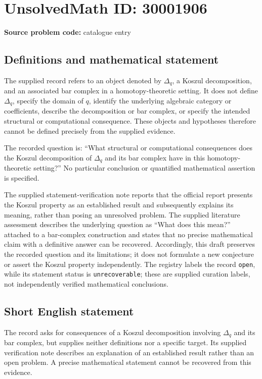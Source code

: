 \documentclass[11pt]{article}
\begin{document}
\section*{UnsolvedMath ID: 30001906}
\textbf{Source problem code:} catalogue entry
\subsection{Definitions and mathematical statement}
The supplied record refers to an object denoted by \(\Delta_q\), a Koszul decomposition, and an associated bar complex in a homotopy-theoretic setting. It does not define \(\Delta_q\), specify the domain of \(q\), identify the underlying algebraic category or coefficients, describe the decomposition or bar complex, or specify the intended structural or computational consequence. These objects and hypotheses therefore cannot be defined precisely from the supplied evidence.

The recorded question is: ``What structural or computational consequences does the Koszul decomposition of \(\Delta_q\) and its bar complex have in this homotopy-theoretic setting?'' No particular conclusion or quantified mathematical assertion is specified.

The supplied statement-verification note reports that the official report presents the Koszul property as an established result and subsequently explains its meaning, rather than posing an unresolved problem. The supplied literature assessment describes the underlying question as ``What does this mean?'' attached to a bar-complex construction and states that no precise mathematical claim with a definitive answer can be recovered. Accordingly, this draft preserves the recorded question and its limitations; it does not formulate a new conjecture or assert the Koszul property independently. The registry labels the record \texttt{open}, while its statement status is \texttt{unrecoverable}; these are supplied curation labels, not independently verified mathematical conclusions.
\subsection{Short English statement}
The record asks for consequences of a Koszul decomposition involving \(\Delta_q\) and its bar complex, but supplies neither definitions nor a specific target. Its supplied verification note describes an explanation of an established result rather than an open problem. A precise mathematical statement cannot be recovered from this evidence.
\end{document}
